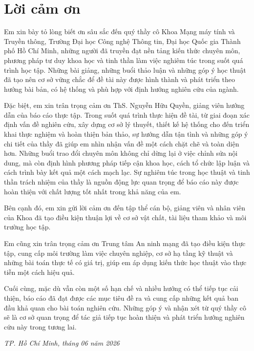 \chapter*{Lời cảm ơn}

Em xin bày tỏ lòng biết ơn sâu sắc đến quý thầy cô Khoa Mạng máy tính và Truyền thông, Trường Đại học Công nghệ Thông tin, Đại học Quốc gia Thành phố Hồ Chí Minh, những người đã truyền đạt nền tảng kiến thức chuyên môn, phương pháp tư duy khoa học và tinh thần làm việc nghiêm túc trong suốt quá trình học tập. Những bài giảng, những buổi thảo luận và những góp ý học thuật đã tạo nên cơ sở vững chắc để đề tài này được hình thành và phát triển theo hướng bài bản, có hệ thống và phù hợp với định hướng nghiên cứu của ngành.

Đặc biệt, em xin trân trọng cảm ơn ThS. Nguyễn Hữu Quyền, giảng viên hướng dẫn của báo cáo thực tập. Trong suốt quá trình thực hiện đề tài, từ giai đoạn xác định vấn đề nghiên cứu, xây dựng cơ sở lý thuyết, thiết kế hệ thống cho đến triển khai thực nghiệm và hoàn thiện bản thảo, sự hướng dẫn tận tình và những góp ý chi tiết của thầy đã giúp em nhìn nhận vấn đề một cách chặt chẽ và toàn diện hơn. Những buổi trao đổi chuyên môn không chỉ dừng lại ở việc chỉnh sửa nội dung, mà còn định hình phương pháp tiếp cận khoa học, cách tổ chức lập luận và cách trình bày kết quả một cách mạch lạc. Sự nghiêm túc trong học thuật và tinh thần trách nhiệm của thầy là nguồn động lực quan trọng để báo cáo này được hoàn thiện với chất lượng tốt nhất trong khả năng của em.

Bên cạnh đó, em xin gửi lời cảm ơn đến tập thể cán bộ, giảng viên và nhân viên của Khoa đã tạo điều kiện thuận lợi về cơ sở vật chất, tài liệu tham khảo và môi trường học tập.

Em cũng xin trân trọng cảm ơn Trung tâm An ninh mạng đã tạo điều kiện thực tập, cung cấp môi trường làm việc chuyên nghiệp, cơ sở hạ tầng kỹ thuật và những bài toán thực tế có giá trị, giúp em áp dụng kiến thức học thuật vào thực tiễn một cách hiệu quả.


Cuối cùng, mặc dù vẫn còn một số hạn chế và nhiều hướng có thể tiếp tục cải thiện, báo cáo đã đạt được các mục tiêu đề ra và cung cấp những kết quả ban đầu khả quan cho bài toán nghiên cứu. Những góp ý và nhận xét từ quý thầy cô sẽ là cơ sở quan trọng để tác giả tiếp tục hoàn thiện và phát triển hướng nghiên cứu này trong tương lai.

\vspace{2cm}
\begin{flushright}
\textit{TP. Hồ Chí Minh, tháng 06 năm 2026}\\[0.5cm]
\end{flushright}

\pagebreak
